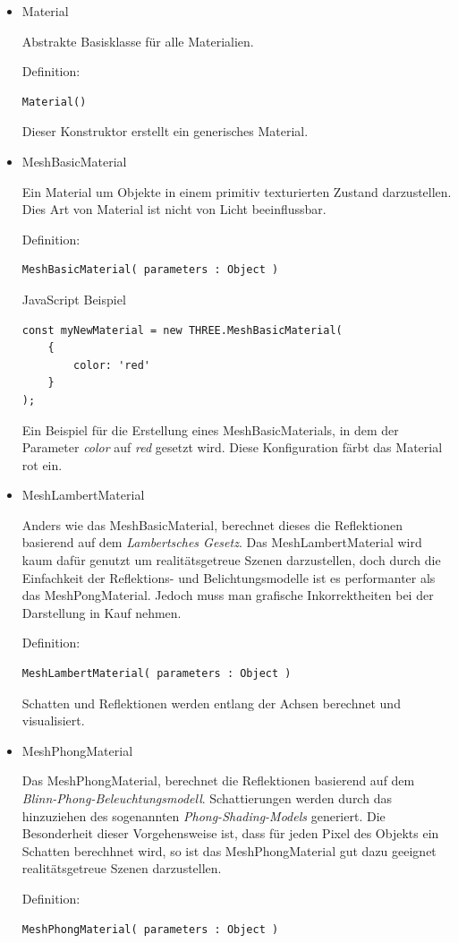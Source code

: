 \begin{itemize}
    \item Material 
    
Abstrakte Basisklasse für alle Materialien.

Definition:
\begin{lstlisting}
Material()
\end{lstlisting}
Dieser Konstruktor erstellt ein generisches Material.
\newpage

\item MeshBasicMaterial 

Ein Material um Objekte in einem primitiv texturierten Zustand darzustellen. Dies Art von Material ist nicht von Licht beeinflussbar.

Definition:
\begin{lstlisting}
MeshBasicMaterial( parameters : Object )
\end{lstlisting}
JavaScript Beispiel
\begin{lstlisting}
const myNewMaterial = new THREE.MeshBasicMaterial(
    {
        color: 'red'
    }
);
\end{lstlisting}
Ein Beispiel für die Erstellung eines MeshBasicMaterials, in dem der Parameter \textit{color} auf \textit{red} gesetzt wird. Diese Konfiguration färbt das Material rot ein. \\

\item MeshLambertMaterial 

Anders wie das MeshBasicMaterial, berechnet dieses die Reflektionen basierend auf dem \textit{Lambertsches Gesetz}. 
Das MeshLambertMaterial wird kaum dafür genutzt um realitätsgetreue Szenen darzustellen, doch durch die Einfachkeit der Reflektions- und Belichtungsmodelle ist es performanter als das MeshPongMaterial. Jedoch muss man grafische Inkorrektheiten bei der Darstellung in Kauf nehmen.

Definition:
\begin{lstlisting}
MeshLambertMaterial( parameters : Object )
\end{lstlisting}
Schatten und Reflektionen werden entlang der Achsen berechnet und visualisiert.
\newpage
\item MeshPhongMaterial 

Das MeshPhongMaterial, berechnet die Reflektionen basierend auf dem \textit{Blinn-Phong-Beleuchtungsmodell}. Schattierungen werden durch das hinzuziehen des sogenannten \textit{Phong-Shading-Models} generiert. Die Besonderheit dieser Vorgehensweise ist, dass für jeden Pixel des Objekts ein Schatten berechhnet wird, so ist das MeshPhongMaterial gut dazu geeignet realitätsgetreue Szenen darzustellen.

Definition:
\begin{lstlisting}
MeshPhongMaterial( parameters : Object )
\end{lstlisting}
\end{itemize}

